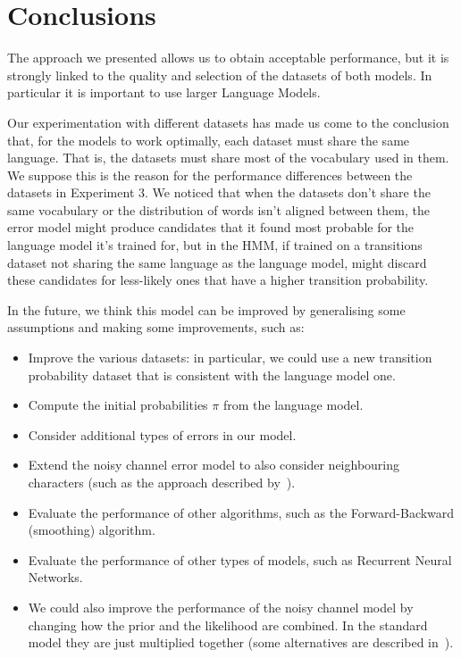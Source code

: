 \chapter{Conclusions}

The approach we presented allows us to obtain acceptable performance, but it is strongly linked to the quality 
and selection of the datasets of both models. In particular it is important to use larger Language Models.

Our experimentation with different datasets has made us come to the conclusion that, for the models to work 
optimally, each dataset must share the same language. That is, the datasets must share most of the vocabulary 
used in them. We suppose this is the reason for the performance differences between the datasets in Experiment 3. We  
noticed that when the datasets don't share the same vocabulary or the distribution of words isn't aligned between them, 
the error model might produce candidates that it found most probable for the language model it's trained for, but in 
the HMM, if trained on a transitions dataset not sharing the same language as the language model, might discard these 
candidates for less-likely ones that have a higher transition probability.

In the future, we think this model can be improved by generalising some assumptions and making some improvements, such 
as:
\begin{itemize}
	\item Improve the various datasets: in particular, we could use a new transition probability dataset that is 
	consistent with the language model one.
	\item Compute the initial probabilities $\pi$ from the language model.
	\item Consider additional types of errors in our model.
	\item Extend the noisy channel error model to also consider neighbouring characters (such as the approach described 
	by~\cite{brill2000improved}).
	\item Evaluate the performance of other algorithms, such as the Forward-Backward (smoothing) algorithm.
	\item Evaluate the performance of other types of models, such as Recurrent Neural Networks.
	\item We could also improve the performance of the noisy channel model by changing how the prior and the 
	likelihood are combined. In the standard model they are just multiplied together (some alternatives are described 
	in~\cite{martin2009speech}).
\end{itemize}

